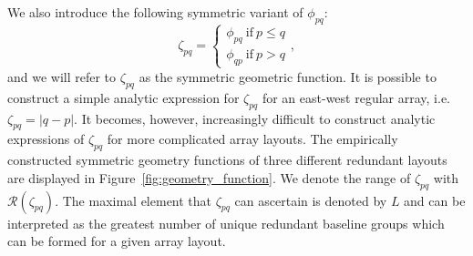 \documentclass[useAMS,usenatbib]{mn2e}
\begin{document}
We also introduce the following symmetric variant of $\phi_{pq}$:
\begin{equation}
\zeta_{pq} = 
\begin{cases}
\phi_{pq}~\textrm{if}~p \leq q\\
\phi_{qp}~\textrm{if}~p>q
\end{cases},
\end{equation} 
and we will refer to $\zeta_{pq}$ as the symmetric geometric function.
It is possible to construct a simple analytic expression for $\zeta_{pq}$ for an east-west regular array, i.e. $\zeta_{pq} = |q-p|$. It becomes, however, increasingly difficult to construct analytic expressions of $\zeta_{pq}$ for more complicated array layouts. The empirically constructed symmetric geometry functions of three different redundant layouts are displayed in Figure~\ref{fig:geometry_function}. We denote the range of $\zeta_{pq}$ with $\mathcal{R}(\zeta_{pq})$. The maximal element that $\zeta_{pq}$ can ascertain is denoted by $L$ and can be interpreted as the greatest number of unique redundant baseline groups which can be formed for a given array layout. 
\end{document}
